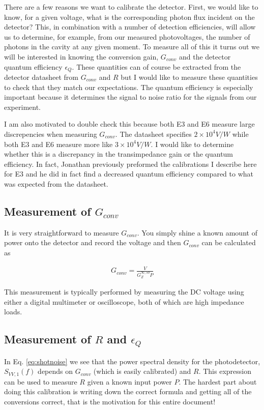 \documentclass[12pt]{article}
\newcommand{\ep}{\epsilon}
\begin{document}
There are a few reasons we want to calibrate the detector. 
First, we would like to know, for a given voltage, what is the corresponding photon flux incident on the detector?
This, in combination with a number of detection efficiencies, will allow us to determine, for example, from our measured photovoltages, the number of photons in the cavity at any given moment.
To measure all of this it turns out we will be interested in knowing the conversion gain, $G_{conv}$ and the detector quantum efficiency $\ep_Q$.
These quantities can of course be extracted from the detector datasheet from $G_{conv}$ and $R$ but I would like to measure these quantities to check that they match our expectations.
The quantum efficiency is especially important because it determines the signal to noise ratio for the signals from our experiment.

I am also motivated to double check this because both E3 and E6 measure large discrepencies when measuring $G_{conv}$.
The datasheet specifies $2\times 10^4 \si{V / W}$ while both E3 and E6 measure more like $3\times 10^4 \si{V / W}$. 
I would like to determine whether this is a discrepancy in the transimpedance gain or the quantum efficiency.
In fact, Jonathan previously preformed the calibrations I describe here for E3 and he did in fact find a decreased quantum efficiency compared to what was expected from the datasheet.

\subsection{Measurement of $G_{conv}$}

It is very straightforward to measure $G_{conv}$.
You simply shine a known amount of power onto the detector and record the voltage and then $G_{conv}$ can be calculated as

\begin{align}
G_{conv} = \frac{V}{G_Z^{\infty,50} P}
\end{align}

This measurement is typically performed by measuring the DC voltage using either a digital multimeter or oscilloscope, both of which are high impedance loads.

\subsection{Measurement of $R$ and $\ep_Q$}

In Eq. \ref{eq:shotnoise} we see that the power spectral density for the photodetector, $S_{VV,1}(f)$ depends on $G_{conv}$ (which is easily calibrated) and $R$.
This expression can be used to measure $R$ given a known input power $P$.
The hardest part about doing this calibration is writing down the correct formula and getting all of the conversions correct, that is the motivation for this entire document!
\end{document}
